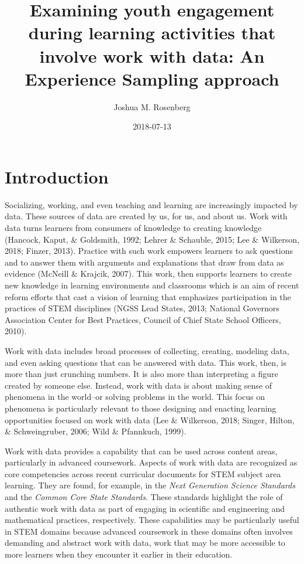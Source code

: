 \documentclass[]{book}
\title{Examining youth engagement during learning activities that involve work
with data: An Experience Sampling approach}
\author{Joshua M. Rosenberg}
\date{2018-07-13}
\theoremstyle{definition}
\theoremstyle{definition}
\theoremstyle{definition}
\theoremstyle{remark}
\begin{document}
\maketitle

{
\setcounter{tocdepth}{1}
\tableofcontents
}
\chapter{Introduction}\label{intro-placemarker}

Socializing, working, and even teaching and learning are increasingly
impacted by data. These sources of data are created by us, for us, and
about us. Work with data turns learners from consumers of knowledge to
creating knowledge (Hancock, Kaput, \& Goldsmith, 1992; Lehrer \&
Schauble, 2015; Lee \& Wilkerson, 2018; Finzer, 2013). Practice with
such work empowers learners to ask questions and to answer them with
arguments and explanations that draw from data as evidence (McNeill \&
Krajcik, 2007). This work, then supports learners to create new
knowledge in learning environments and classrooms which is an aim of
recent reform efforts that cast a vision of learning that emphasizes
participation in the practices of STEM disciplines (NGSS Lead States,
2013; National Governors Association Center for Best Practices, Council
of Chief State School Officers, 2010).

Work with data includes broad processes of collecting, creating,
modeling data, and even asking questions that can be answered with data.
This work, then, is more than just crunching numbers. It is also more
than interpreting a figure created by someone else. Instead, work with
data is about making sense of phenomena in the world--or solving
problems in the world. This focus on phenomena is particularly relevant
to those designing and enacting learning opportunities focused on work
with data (Lee \& Wilkerson, 2018; Singer, Hilton, \& Schweingruber,
2006; Wild \& Pfannkuch, 1999).

Work with data provides a capability that can be used across content
areas, particularly in advanced coursework. Aspects of work with data
are recognized as core competencies across recent curricular documents
for STEM subject area learning. They are found, for example, in the
\emph{Next Generation Science Standards} and the \emph{Common Core State
Standards}. These standards highlight the role of authentic work with
data as part of engaging in scientific and engineering and mathematical
practices, respectively. These capabilities may be particularly useful
in STEM domains because advanced coursework in these domains often
involves demanding and abstract work with data, work that may be more
accessible to more learners when they encounter it earlier in their
education.
\end{document}
